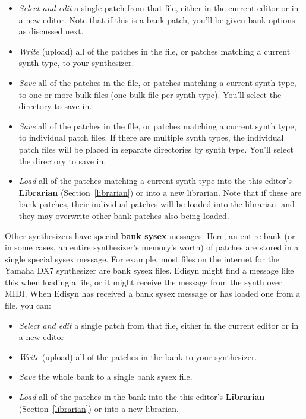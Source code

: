 \documentclass{article}
\begin{document}
\begin{itemize}
\item {\it Select and edit} a single patch from that file, either in the current editor or in a new editor.  Note that if this is a bank patch, you'll be given bank options as discussed next.
\item {\it Write} (upload) all of the patches in the file, or patches matching a current synth type, to your synthesizer.
\item {\it Save} all of the patches in the file, or patches matching a current synth type, to one or more bulk files (one bulk file per synth type). You'll select the directory to save in.
\item {\it Save} all of the patches in the file, or patches matching a current synth type, to individual patch files.  If there are multiple synth types, the individual patch files will be placed in separate directories by synth type.   You'll select the directory to save in.
\item {\it Load} all of the patches matching a current synth type into the this editor's {\bf Librarian} (Section~\ref{librarian}) or into a new librarian.  Note that if these are bank patches, their individual patches will be loaded into the librarian: and they may overwrite other bank patches also being loaded.
\end{itemize}

Other synthesizers have special {\bf bank sysex} messages.  Here, an entire bank (or in some cases, an entire synthesizer's memory's worth) of patches are stored in a single special sysex message.  For example, most files on the internet for the Yamaha DX7 synthesizer are bank sysex files.   Edisyn might find a message like this when loading a file, or it might receive the message from the synth over MIDI.   When Edisyn has received a bank sysex message or has loaded one from a file, you can:

\begin{itemize}
\item {\it Select and edit} a single patch from that file, either in the current editor or in a new editor
\item {\it Write} (upload) all of the patches in the bank to your synthesizer.
\item {\it Save} the whole bank to a single bank sysex file.
\item {\it Load} all of the patches in the bank into the this editor's {\bf Librarian} (Section~\ref{librarian}) or into a new librarian.    \end{itemize}
\end{document}
